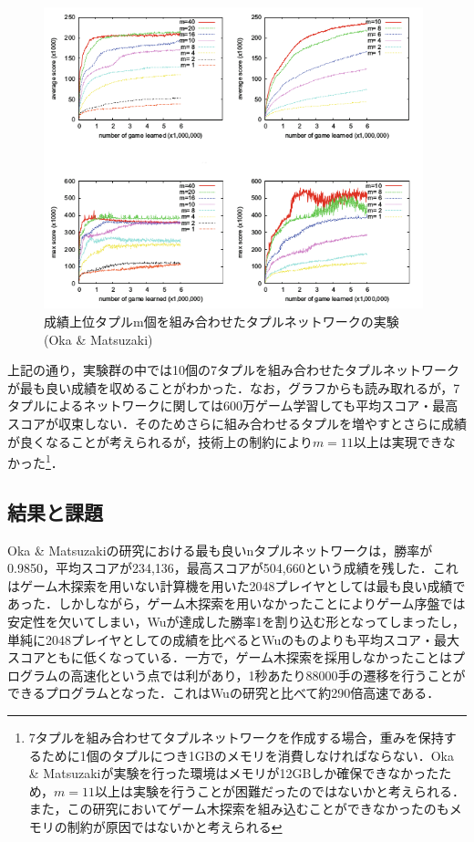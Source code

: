 \documentclass{suribt}
\begin{document}
\begin{figure}[t]
	\begin{center}
	\includegraphics[width=11cm]{figure_005.png}
	\caption{成績上位タプルm個を組み合わせたタプルネットワークの実験 (Oka \& Matsuzaki)}
	\label{figure_005}
	\end{center}
\end{figure}

上記の通り，実験群の中では10個の7タプルを組み合わせたタプルネットワークが最も良い成績を収めることがわかった．なお，グラフからも読み取れるが，7タプルによるネットワークに関しては600万ゲーム学習しても平均スコア・最高スコアが収束しない．そのためさらに組み合わせるタプルを増やすとさらに成績が良くなることが考えられるが，技術上の制約により$m=11$以上は実現できなかった\footnote{7タプルを組み合わせてタプルネットワークを作成する場合，重みを保持するために1個のタプルにつき1GBのメモリを消費しなければならない．Oka \& Matsuzakiが実験を行った環境はメモリが12GBしか確保できなかったため，$m=11$以上は実験を行うことが困難だったのではないかと考えられる．また，この研究においてゲーム木探索を組み込むことができなかったのもメモリの制約が原因ではないかと考えられる}．

\subsection{結果と課題}
Oka \& Matsuzakiの研究における最も良いnタプルネットワークは，勝率が0.9850，平均スコアが234,136，最高スコアが504,660という成績を残した．これはゲーム木探索を用いない計算機を用いた2048プレイヤとしては最も良い成績であった．しかしながら，ゲーム木探索を用いなかったことによりゲーム序盤では安定性を欠いてしまい，Wuが達成した勝率1を割り込む形となってしまったし，単純に2048プレイヤとしての成績を比べるとWuのものよりも平均スコア・最大スコアともに低くなっている．一方で，ゲーム木探索を採用しなかったことはプログラムの高速化という点では利があり，1秒あたり88000手の遷移を行うことができるプログラムとなった．これはWuの研究と比べて約290倍高速である．
\end{document}
